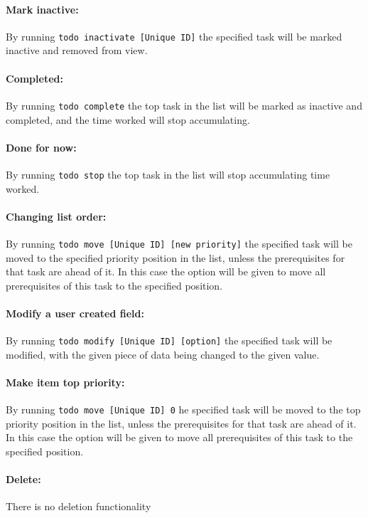 \documentclass[12pt]{article}
\newcommand{\e}[1] {{\tt #1}}
\begin{document}
\paragraph{Mark inactive:} \label{sec:Mark inactive} By running \e{todo inactivate [Unique ID]} the specified task will be marked inactive and removed from view.
\paragraph{Completed:} \label{sec:Completed} By running \e{todo complete} the top task in the list will be marked as inactive and completed, and the time worked will stop accumulating.
\paragraph{Done for now:} \label{sec:Done for now} By running \e{todo stop} the top task in the list will stop accumulating time worked.
\paragraph{Changing list order:} \label{sec:Change order} By running \e{todo move [Unique ID] [new priority]} the specified task will be moved to the specified priority position in the list, unless the prerequisites for that task are ahead of it. In this case the option will be given to move all prerequisites of this task to the specified position.
\paragraph{Modify a user created field:} \label{sec:Modify} By running \e{todo modify [Unique ID] [option]} the specified task will be modified, with the given piece of data being changed to the given value.
\paragraph{Make item top priority:} \label{sec:Make top} By running \e{todo move [Unique ID] 0} he specified task will be moved to the top priority position in the list, unless the prerequisites for that task are ahead of it. In this case the option will be given to move all prerequisites of this task to the specified position.

\paragraph{Delete:} \label{sec:Delete} There is no deletion functionality
\end{document}
